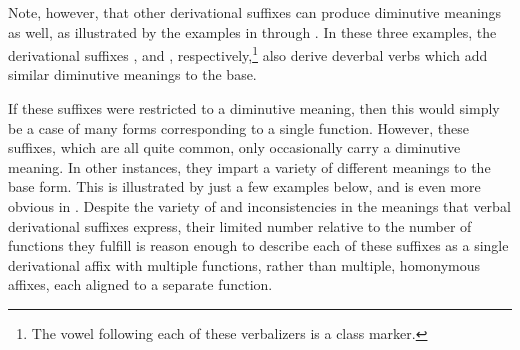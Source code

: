 Note, however, that other derivational suffixes can produce diminutive meanings as well, as illustrated by the examples in  through . 
\ea\label{verbDIMex4}
\z
\ea\label{verbDIMex5}
\z
\ea\label{verbDIMex6}
\z
In these three examples, the derivational suffixes ,  and , respectively,\footnote{The vowel following each of these verbalizers is a class marker.} 
also derive deverbal verbs which add similar diminutive meanings to the base. 

If these suffixes were restricted to a diminutive meaning, then this would simply be a case of many forms corresponding to a single function. However, these suffixes, which are all quite common, only occasionally carry a diminutive meaning. In other instances, they impart a variety of different meanings to the base form. This is illustrated by just a few examples below, and is even more obvious in \citet{Ruong1943}. Despite the variety of and inconsistencies in the meanings that verbal derivational suffixes express, their limited number relative to the number of functions they fulfill is reason enough to describe each of these suffixes as a single derivational affix with multiple functions, rather than multiple, homonymous affixes, each aligned to a separate function. 



